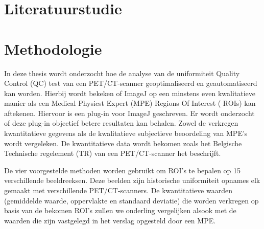 \documentclass{hogent-article}
\begin{document}
\section{Literatuurstudie}%
\label{sec:literatuurstudie}






\lipsum[4-9]

\section{Methodologie}%
\label{sec:methodologie}

In deze thesis wordt onderzocht hoe de analyse van de uniformiteit Quality Control (QC) test van een PET/CT-scanner geoptimaliseerd en geautomatiseerd kan worden. Hierbij wordt bekeken  of ImageJ op  een minstens even kwalitatieve manier als een Medical Physicst Expert (MPE)  Regions Of Interest ( ROIs) kan aftekenen. Hiervoor is een plug-in voor ImageJ geschreven. Er wordt onderzocht of deze plug-in  objectief betere resultaten kan behalen. Zowel de verkregen kwantitatieve gegevens als de kwalitatieve subjectieve beoordeling van MPE’s wordt vergeleken. De kwantitatieve data wordt bekomen zoals het Belgische Technische regelement (TR) van een PET/CT-scanner het beschrijft. \textcite{FANC2020}

De vier voorgestelde methoden worden gebruikt om ROI's te bepalen op 15 verschillende beeldreeksen. Deze beelden zijn historische uniformiteit opnames elk gemaakt met verschillende PET/CT-scanners. De kwantitatieve waarden (gemiddelde waarde, oppervlakte en standaard deviatie) die worden verkregen op basis van de bekomen ROI's zullen we onderling vergelijken alsook met de waarden die zijn vastgelegd in het verslag opgesteld door een  MPE. 
\end{document}
